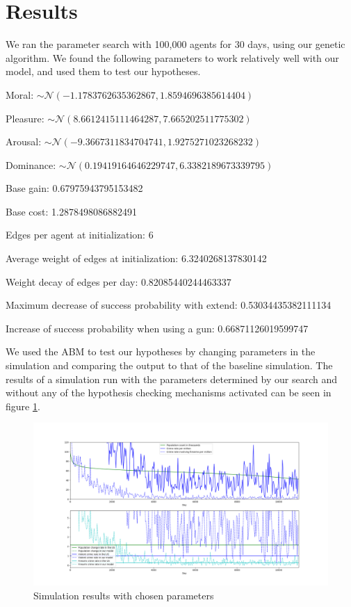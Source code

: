 \documentclass{JASSS}
\begin{document}
\section{Results}
We ran the parameter search with 100,000 agents for 30 days, using our genetic algorithm.
We found the following parameters to work relatively well with our model, and used them to test
our hypotheses.
\begin{enumerate*}
	\item Moral: $ \sim\mathcal{N}(-1.1783762635362867, 1.8594696385614404) $
	\item Pleasure: $ \sim\mathcal{N}(8.6612415111464287, 7.665202511775302) $
	\item Arousal: $ \sim\mathcal{N}(-9.3667311834704741, 1.9275271023268232) $
	\item Dominance: $ \sim\mathcal{N}(0.19419164646229747, 6.3382189673339795) $
	\item Base gain: 0.67975943795153482
	\item Base cost: 1.2878498086882491
	\item Edges per agent at initialization: 6
	\item Average weight of edges at initialization: 6.3240268137830142
	\item Weight decay of edges per day: 0.82085440244463337
	\item Maximum decrease of success probability with extend: 0.53034435382111134
	\item Increase of success probability when using a gun: 0.66871126019599747
\end{enumerate*}

We used the ABM to test our hypotheses by changing parameters in the simulation and comparing the
output to that of the baseline simulation. The results of a simulation run with the parameters
determined by our search and without any of the hypothesis checking mechanisms activated can
be seen in figure \ref{fig:normal}.

\begin{figure}[!t]
\centering
\includegraphics[width=\textwidth]{those_graphs.png}
\caption{Simulation results with chosen parameters}
\label{fig:normal}
\end{figure}
\end{document}
